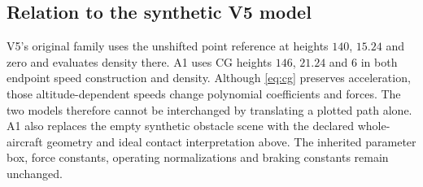 \subsection{Relation to the synthetic V5 model}
V5's original family uses the unshifted point reference at heights $140$, $15.24$ and zero and evaluates density there. A1 uses CG heights $146$, $21.24$ and $6$ in both endpoint speed construction and density. Although \eqref{eq:cg} preserves acceleration, those altitude-dependent speeds change polynomial coefficients and forces. The two models therefore cannot be interchanged by translating a plotted path alone. A1 also replaces the empty synthetic obstacle scene with the declared whole-aircraft geometry and ideal contact interpretation above. The inherited parameter box, force constants, operating normalizations and braking constants remain unchanged.
